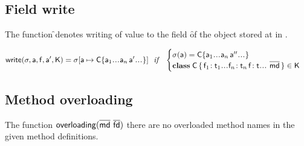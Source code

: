 \documentclass[acmlarge, anonymous, authordraft]{acmart}
\begin{document}
\subsection{Field write}

The function \setf\s\a\f\ap\K denotes writing of value \ap to the field \f of
the object stored at \a in \s.

\begin{equation*}
\setf \s\a\f\ap\K= \Map\s{\Bind{\a}{\obj\C{\a_1\dots\a_n\,\ap\dots}}}
  ~~\mathit{if}~~ \begin{cases}
   \s(\a) = \obj\C{\a_1\dots\a_n\,\app\dots}\\
   \Class\C{\Fdef{\f_1}{\t_1}\dots\Fdef{\f_n}{\t_n}\,\Fdef\f\t\dots}{\b\md}\in\K
\end{cases}
\end{equation*}

\subsection{Method overloading}

The function $\xt{overloading}(\b\md ~ \b\fd)$ there are no overloaded method names in the
given method definitions.


\begin{mathpar}


\end{mathpar}

\begin{mathpar}
\end{mathpar}
\end{document}
